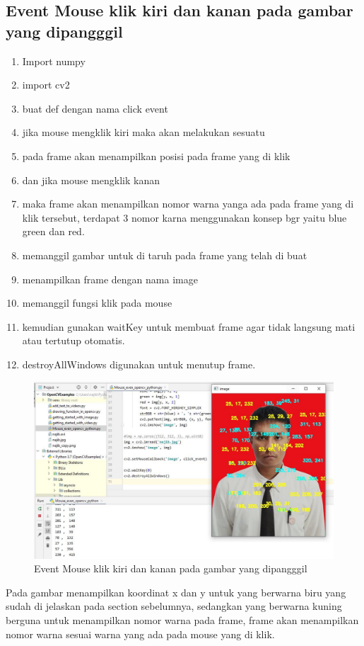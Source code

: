 \newpage
\subsection{Event Mouse klik kiri dan kanan pada gambar yang dipangggil}

\begin{enumerate}
	\item Import numpy
	\item import cv2
	\item buat def dengan nama click event
	\item jika mouse mengklik kiri maka akan melakukan sesuatu
	\item pada frame akan menampilkan posisi pada frame yang di klik
	\item dan jika mouse mengklik kanan
	\item maka frame akan menampilkan nomor warna yanga ada pada frame yang di klik tersebut, terdapat 3 nomor karna menggunakan konsep bgr yaitu blue green dan red.
	\item memanggil gambar untuk di taruh pada frame yang telah di buat
	\item menampilkan frame dengan nama image
	\item memanggil fungsi klik pada mouse
	\item kemudian gunakan waitKey untuk membuat frame agar tidak langsung mati atau tertutup otomatis.
	\item destroyAllWindows digunakan untuk menutup frame.
\end{enumerate}

\newpage
\begin{figure}[ht]
\centering
\includegraphics[scale=0.47]{figures/2,22.jpg}
\caption{Event Mouse klik kiri dan kanan pada gambar yang dipangggil}
\label{contoh}
\end{figure}
Pada gambar menampilkan koordinat x dan y untuk yang berwarna biru yang sudah di jelaskan pada section sebelumnya, sedangkan yang berwarna kuning berguna untuk menampilkan nomor warna pada frame, frame akan menampilkan nomor warna sesuai warna yang ada pada mouse yang di klik.




